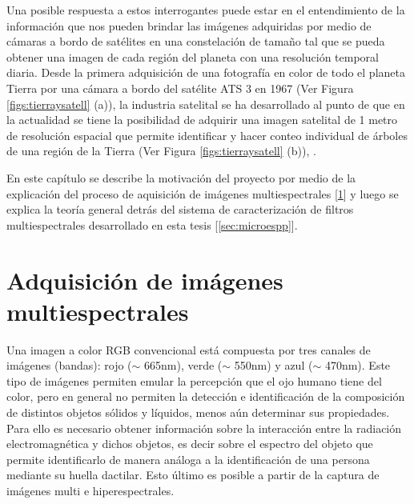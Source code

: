 Una posible respuesta a estos interrogantes puede estar en el entendimiento de la información que nos pueden brindar las imágenes adquiridas por medio de cámaras a bordo de satélites en una constelación de tamaño tal que se pueda obtener una imagen de cada región del planeta con una resolución temporal diaria. Desde la primera adquisición de una fotografía en color de todo el planeta Tierra por una cámara a bordo del satélite ATS 3 en 1967 (Ver Figura \ref{figs:tierraysatell} (a)), la industria satelital se ha desarrollado al punto de que en la actualidad se tiene la posibilidad de adquirir una imagen satelital de 1 metro de resolución espacial que permite identificar y hacer conteo individual de árboles de una región de la Tierra (Ver Figura \ref{figs:tierraysatell} (b)), .

En este capítulo se describe la motivación del proyecto por medio de la explicación del proceso de aquisición de imágenes multiespectrales [\ref{sec:motivacion}] y luego se explica la teoría general detrás del sistema de caracterización de filtros multiespectrales desarrollado en esta tesis [\ref{sec:microespp}].

\singlespacing
\section{Adquisición de imágenes multiespectrales}
\label{sec:motivacion}


\hspace{0.5cm}Una imagen a color RGB convencional está compuesta por tres 
canales de 
imágenes (bandas): rojo 
($\sim$ 665nm), verde ($\sim$ 550nm) y azul ($\sim$ 470nm). Este tipo de 
imágenes permiten emular la percepción que el ojo humano tiene del color, pero 
en general no permiten la detección e identificación de la composición de distintos objetos 
sólidos y 
líquidos, menos 
aún determinar sus propiedades. Para ello 
es necesario obtener información sobre la interacción entre la radiación electromagnética y dichos objetos, es decir sobre el espectro del objeto que permite identificarlo de manera análoga a la identificación de una persona mediante su huella dactilar. Esto último es posible a partir de la captura de imágenes multi e hiperespectrales.

